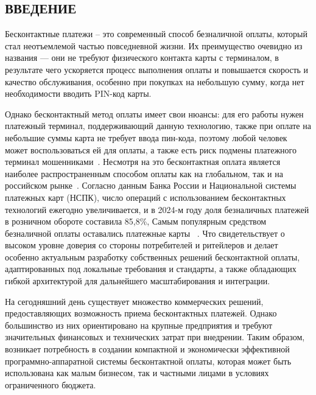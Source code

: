 \newpage

\begin{center}
	\section*{\centering ВВЕДЕНИЕ}
\end{center}

Бесконтактные платежи – это современный способ безналичной оплаты, который стал неотъемлемой частью повседневной жизни.
Их преимущество очевидно из названия --- они не требуют физического контакта карты с терминалом, в результате чего ускоряется процесс выполнения оплаты и повышается скорость и качество обслуживания, особенно при покупках на небольшую сумму, когда нет необходимости вводить PIN-код карты.

Однако бесконтактный метод оплаты имеет свои нюансы: для его работы нужен платежный терминал, поддерживающий данную технологию, также при оплате на небольшие суммы карта не требует ввода пин-кода, поэтому любой человек может воспользоваться ей для оплаты, а также есть риск подмены платежного терминал мошенниками~\cite{codejournal}.
Несмотря на это бесконтактная оплата является наиболее распространенным способом оплаты как на глобальном, так и на российском рынке~\cite{posterminals}.
Согласно данным Банка России и Национальной системы платежных карт (НСПК), число операций с использованием бесконтактных технологий ежегодно увеличивается, и в 2024-м году доля безналичных платежей в розничном обороте составила 85,8\%,
Самым популярным средством безналичной оплаты оставались платежные карты
~\cite{cdrf_report2024,cdrf_results2024}.
Что свидетельствует о высоком уровне доверия со стороны потребителей и ритейлеров и делает особенно актуальным разработку собственных решений бесконтактной оплаты, адаптированных под локальные требования и стандарты, а также обладающих гибкой архитектурой для дальнейшего масштабирования и интеграции.

На сегодняшний день существует множество коммерческих решений, предоставляющих возможность приема бесконтактных платежей.
Однако большинство из них ориентировано на крупные предприятия и требуют значительных финансовых и технических затрат при внедрении.
Таким образом, возникает потребность в создании компактной и экономически эффективной программно-аппаратной системы бесконтактной оплаты, которая может быть использована как малым бизнесом, так и частными лицами в условиях ограниченного бюджета.



